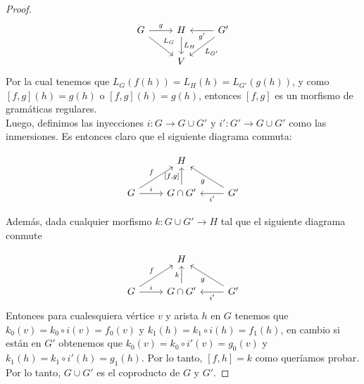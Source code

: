 \documentclass[../main.tex]{subfiles}
\begin{document}
\begin{proof}
 	\[
	\begin{tikzcd}
		G \arrow{r}{g} \arrow{rd}{L_G} & H \arrow{d}{L_H}  & G' \arrow{ld}{L_{G'}} \arrow{l}{g'} \\
		& V 
	\end{tikzcd}
	\]
	Por la cual tenemos que $L_G(f(h))=L_H(h)=L_{G'}(g(h))$, y como $[f,g](h)=g(h)$ o $[f,g](h)=g(h)$, entonces $[f,g]$ es un morfismo de gramáticas regulares. \\
	Luego, definimos las inyecciones $i:G \to G \cup G'$ y $i':G' \to G \cup G'$ como las inmersiones. Es entonces claro que el siguiente diagrama conmuta: 
	
 	 \[
	\begin{tikzcd} 		
		& H  & \\
		G \arrow{r}{i} \arrow{ru}{f} & G\cap G' \arrow{u}{[f,g]} & G' \arrow{l}{i'} \arrow{lu}{g}
	\end{tikzcd}
	\]
	
	Además, dada cualquier morfismo $k: G \cup G' \to H$ tal que el siguiente diagrama conmute
	
	 	 \[
	\begin{tikzcd} 		
		& H  & \\
		G \arrow{r}{i} \arrow{ru}{f} & G\cap G' \arrow{u}{k} & G' \arrow{l}{i'} \arrow{lu}{g}
	\end{tikzcd}
	\]
	Entonces para cualesquiera vértice $v$ y arista $h$ en $G$ tenemos que 
	$k_0(v)=k_0\circ i(v) = f_0(v)$ y $k_1(h)=k_1\circ i(h) = f_1(h)$, en cambio si están en $G'$ obtenemos que $k_0(v)=k_0\circ i'(v) = g_0(v)$ y $k_1(h)=k_1\circ i'(h) = g_1(h)$. Por lo tanto, $[f,h]=k$ como queríamos probar. \\
	Por lo tanto, $G \cup G'$ es el coproducto de $G$ y $G'$. 
 \end{proof}

	
 
\end{document}
